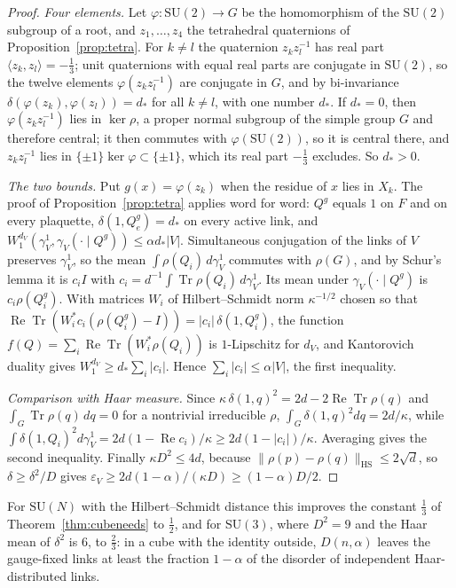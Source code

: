 \documentclass[aps,prd,twocolumn,superscriptaddress,nofootinbib,longbibliography,floatfix,amsmath,amssymb,10pt]{revtex4-2}
\theoremstyle{definition}
\theoremstyle{remark}
\newcommand{\SU}{\mathrm{SU}}
\newcommand{\Tr}{\operatorname{Tr}}
\begin{document}
\begin{proof}
\emph{Four elements.} Let $\varphi\colon\SU(2)\to G$ be the homomorphism of
the $\SU(2)$ subgroup of a root, and $z_1,\dots,z_4$ the tetrahedral
quaternions of Proposition~\ref{prop:tetra}. For $k\ne l$ the quaternion
$z_kz_l^{-1}$ has real part $\langle z_k,z_l\rangle=-\frac13$; unit
quaternions with equal real parts are conjugate in $\SU(2)$, so the twelve
elements $\varphi(z_kz_l^{-1})$ are conjugate in $G$, and by bi-invariance
$\delta(\varphi(z_k),\varphi(z_l))=d_*$ for all $k\ne l$, with one number
$d_*$. If $d_*=0$, then $\varphi(z_kz_l^{-1})$ lies in $\ker\rho$, a proper
normal subgroup of the simple group $G$ and therefore central; it then
commutes with $\varphi(\SU(2))$, so it is central there, and $z_kz_l^{-1}$
lies in $\{\pm1\}\ker\varphi\subset\{\pm1\}$, which its real part $-\frac13$
excludes. So $d_*>0$.

\emph{The two bounds.} Put $g(x)=\varphi(z_k)$ when the residue of $x$ lies
in $X_k$. The proof of Proposition~\ref{prop:tetra} applies word for word:
$Q^g$ equals $1$ on $F$ and on every plaquette, $\delta(1,Q^g_e)=d_*$ on
every active link, and $W_1^{d_V}(\gamma^1_V,\gamma_V(\cdot\mid Q^g))\le
\alpha d_*|V|$. Simultaneous conjugation of the links of $V$ preserves
$\gamma^1_V$, so the mean $\int\rho(Q_i)\,d\gamma^1_V$ commutes with
$\rho(G)$, and by Schur's lemma it is $c_iI$ with $c_i=d^{-1}\int\Tr\rho(Q_i)
\,d\gamma^1_V$. Its mean under $\gamma_V(\cdot\mid Q^g)$ is $c_i\rho(Q^g_i)$.
With matrices $W_i$ of Hilbert--Schmidt norm $\kappa^{-1/2}$ chosen so that
$\operatorname{Re}\Tr(W_i^*c_i(\rho(Q^g_i)-I))=|c_i|\,\delta(1,Q^g_i)$, the
function $f(Q)=\sum_i\operatorname{Re}\Tr(W_i^*\rho(Q_i))$ is $1$-Lipschitz
for $d_V$, and Kantorovich duality gives $W_1^{d_V}\ge d_*\sum_i|c_i|$.
Hence $\sum_i|c_i|\le\alpha|V|$, the first inequality.

\emph{Comparison with Haar measure.} Since $\kappa\,\delta(1,q)^2=2d-2
\operatorname{Re}\Tr\rho(q)$ and $\int_G\Tr\rho(q)\,dq=0$ for a nontrivial
irreducible $\rho$, $\int_G\delta(1,q)^2dq=2d/\kappa$, while $\int\delta(1,
Q_i)^2d\gamma^1_V=2d(1-\operatorname{Re}c_i)/\kappa\ge2d(1-|c_i|)/\kappa$.
Averaging gives the second inequality. Finally $\kappa D^2\le4d$, because
$\|\rho(p)-\rho(q)\|_{\mathrm{HS}}\le2\sqrt d$, so $\delta\ge\delta^2/D$
gives $\varepsilon_V\ge2d(1-\alpha)/(\kappa D)\ge(1-\alpha)D/2$.
\end{proof}

For $\SU(N)$ with the Hilbert--Schmidt distance this improves the constant
$\frac13$ of Theorem~\ref{thm:cubeneeds} to $\frac12$, and for $\SU(3)$, where
$D^2=9$ and the Haar mean of $\delta^2$ is $6$, to $\frac23$: in a cube with
the identity outside, $D(n,\alpha)$ leaves the gauge-fixed links at least the
fraction $1-\alpha$ of the disorder of independent Haar-distributed links.
\end{document}
